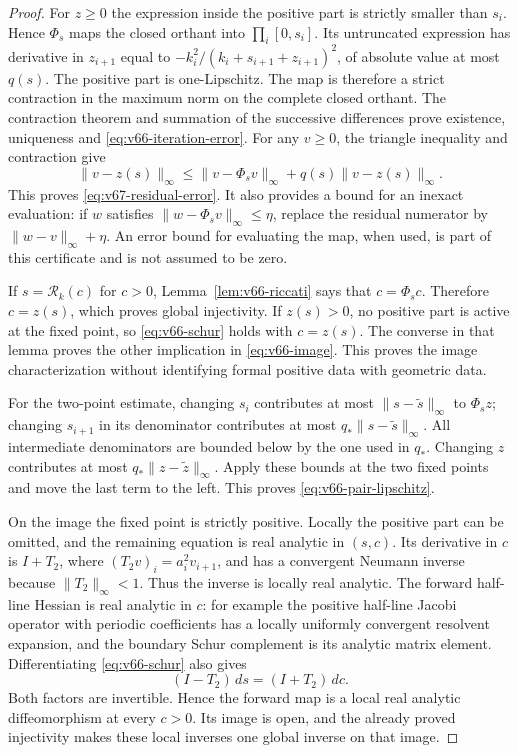 \begin{proof}
For $z\ge0$ the expression inside the positive part is strictly smaller
than $s_i$.  Hence $\Phi_s$ maps the closed orthant into
$\prod_i[0,s_i]$.  Its untruncated expression has derivative in
$z_{i+1}$ equal to
$-k_i^2/(k_i+s_{i+1}+z_{i+1})^2$, of absolute value at most $q(s)$.
The positive part is one-Lipschitz.  The map is therefore a strict
contraction in the maximum norm on the complete closed orthant.
The contraction theorem and summation of the successive differences
prove existence, uniqueness and \eqref{eq:v66-iteration-error}.
For any $v\ge0$, the triangle inequality and contraction give
\[
 \|v-z(s)\|_\infty
 \le\|v-\Phi_s v\|_\infty+q(s)\|v-z(s)\|_\infty.
\]
This proves \eqref{eq:v67-residual-error}.  It also provides a bound
for an inexact evaluation: if $w$ satisfies
$\|w-\Phi_s v\|_\infty\le\eta$, replace the residual numerator
by $\|w-v\|_\infty+\eta$.  An error bound for evaluating the map,
when used, is part of this certificate and is not assumed to be zero.

If $s=\mathcal R_k(c)$ for $c>0$, Lemma~\ref{lem:v66-riccati} says
that $c=\Phi_s c$.  Therefore $c=z(s)$, which proves global
injectivity.  If $z(s)>0$, no positive part is active at the fixed
point, so \eqref{eq:v66-schur} holds with $c=z(s)$.  The converse
in that lemma proves the other implication in \eqref{eq:v66-image}.
This proves the image characterization without identifying formal
positive data with geometric data.

For the two-point estimate, changing $s_i$ contributes at most
$\|s-\widetilde s\|_\infty$ to $\Phi_s z$; changing $s_{i+1}$
in its denominator contributes at most
$q_*\|s-\widetilde s\|_\infty$.  All intermediate denominators
are bounded below by the one used in $q_*$.  Changing $z$ contributes
at most $q_*\|z-\widetilde z\|_\infty$.  Apply these bounds at
the two fixed points and move the last term to the left.  This proves
\eqref{eq:v66-pair-lipschitz}.

On the image the fixed point is strictly positive.  Locally the positive
part can be omitted, and the remaining equation is real analytic in
$(s,c)$.  Its derivative in $c$ is $I+T_2$, where
$(T_2 v)_i=a_i^2v_{i+1}$, and has a convergent Neumann inverse because
$\|T_2\|_\infty<1$.  Thus the inverse is locally real analytic.
The forward half-line Hessian is real analytic in $c$: for example the
positive half-line Jacobi operator with periodic coefficients has a locally
uniformly convergent
resolvent expansion, and the boundary Schur complement is its analytic
matrix element.  Differentiating \eqref{eq:v66-schur} also gives
\begin{equation}\label{eq:v66-differential}
 (I-T_2)\,ds=(I+T_2)\,dc.
\end{equation}
Both factors are invertible.  Hence the forward map is a local real
analytic diffeomorphism at every $c>0$.  Its image is open, and the
already proved injectivity makes these local inverses one global inverse
on that image.
\end{proof}


